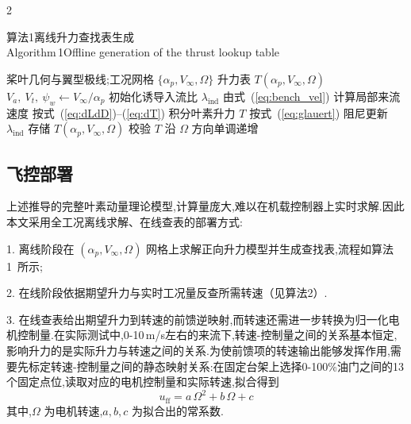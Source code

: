 \documentclass{aas}
\begin{document}
\begin{multicols}{2}
\begin{center}
\begin{minipage}{0.98\columnwidth}
\centering
{\small 算法1\quad 离线升力查找表生成
\\
Algorithm\,1\quad Offline generation of the thrust lookup table}
\vskip2mm
\footnotesize
\begin{algorithmic}[1]
\Require 桨叶几何与翼型极线;工况网格 $\{\alpha_p,V_\infty,\Omega\}$
\Ensure 升力表 $T(\alpha_p,V_\infty,\Omega)$
    \State $V_a,\ V_t,\ \psi_w\gets V_\infty/\alpha_p$
        \State 初始化诱导入流比 $\lambda_{\mathrm{ind}}$
        \Repeat
            \State 由式~(\ref{eq:bench_vel}) 计算局部来流速度
            \State 按式~(\ref{eq:dLdD})--(\ref{eq:dT}) 积分叶素升力 $T$
            \State 按式~(\ref{eq:glauert}) 阻尼更新 $\lambda_{\mathrm{ind}}$
        \State 存储 $T(\alpha_p,V_\infty,\Omega)$
    \EndFor
    \State 校验 $T$ 沿 $\Omega$ 方向单调递增
\EndFor
\end{algorithmic}
\end{minipage}
\end{center}

\subsection{飞控部署}
上述推导的完整叶素动量理论模型,计算量庞大,难以在机载控制器上实时求解.因此本文采用全工况离线求解、在线查表的部署方式:

1. 离线阶段在 $(\alpha_p,V_\infty,\Omega)$ 网格上求解正向升力模型并生成查找表,流程如算法1~所示;

2. 在线阶段依据期望升力与实时工况量反查所需转速（见算法2）.

3. 在线查表给出期望升力到转速的前馈逆映射,而转速还需进一步转换为归一化电机控制量.在实际测试中,0-10\,m/s左右的来流下,转速-控制量之间的关系基本恒定,影响升力的是实际升力与转速之间的关系.为使前馈项的转速输出能够发挥作用,需要先标定转速-控制量之间的静态映射关系:在固定台架上选择0-100\%油门之间的13个固定点位,读取对应的电机控制量和实际转速,拟合得到
\begin{equation}
u_{\mathrm{ff}}=a\,\Omega^2+b\,\Omega+c
\label{eq:rpm_calib}
\end{equation}
其中,$\Omega$ 为电机转速,$a,b,c$ 为拟合出的常系数.


\end{multicols}
\end{document}
